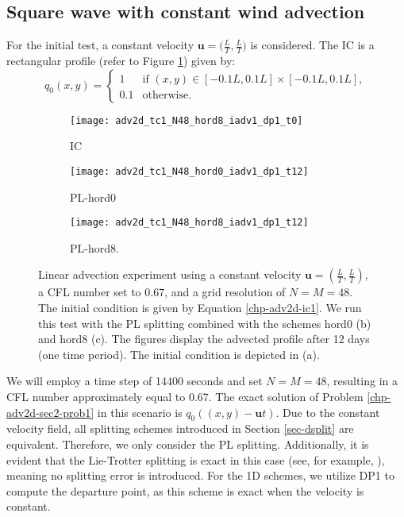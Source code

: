 \subsection{Square wave with constant wind advection}
For the initial test, a constant velocity $\boldsymbol{u}=\big(\frac{L}{T},\frac{L}{T}\big)$ is considered.
The IC is a rectangular profile (refer to Figure \ref{chp-adv2d-sec-exp-adv1-a}) given by:
\begin{equation}
	\label{chp-adv2d-ic1}
	q_0(x,y) =  
	\begin{cases}
		1 & \text{if } (x,y) \in [-0.1L,0.1L]\times [-0.1L,0.1L],\\
		0.1 & \text{otherwise}.
	\end{cases}
\end{equation}
\begin{figure}[!htb]
	\centering
	\begin{subfigure}{0.3\textwidth}
		\centering
		\texttt{[image: adv2d\_tc1\_N48\_hord8\_iadv1\_dp1\_t0]}
		\caption{IC\label{chp-adv2d-sec-exp-adv1-a}}
	\end{subfigure}
	\begin{subfigure}{0.3\textwidth}
		\centering
		\texttt{[image: adv2d\_tc1\_N48\_hord0\_iadv1\_dp1\_t12]}
		\caption{PL-hord0\label{chp-adv2d-sec-exp-adv1-b}}
	\end{subfigure}
	\begin{subfigure}{0.3\textwidth}
		\centering
		\texttt{[image: adv2d\_tc1\_N48\_hord8\_iadv1\_dp1\_t12]}
		\caption{PL-hord8.\label{chp-adv2d-sec-exp-adv1-c}}
	\end{subfigure}	
	\caption{Linear advection experiment using a constant velocity $\boldsymbol{u} = \left(\frac{L}{T},\frac{L}{T}\right)$, 
	a CFL number set to $0.67$, and a grid resolution of $N=M=48$.
	The initial condition is given by Equation \eqref{chp-adv2d-ic1}.
	We run this test with the PL splitting combined with the schemes hord0 (b) and hord8 (c).
        The figures display the advected profile after 12 days (one time period).
        The initial condition is depicted in (a). \label{chp-adv2d-sec-exp-adv1}}
\end{figure}

We will employ a time step of 14400 seconds and set $N=M=48$, resulting in a CFL number approximately equal to 0.67.
The exact solution of Problem \ref{chp-adv2d-sec2-prob1} in this scenario is $q_0((x,y)-\boldsymbol{u}t)$.
Due to the constant velocity field, all splitting schemes introduced in Section \ref{sec-dsplit} are equivalent.
Therefore, we only consider the PL splitting. Additionally, it is evident that the Lie-Trotter splitting is exact in this case 
(see, for example, \cite[p.~202-203]{leveque:1990}), meaning no splitting error is introduced.
For the 1D schemes, we utilize DP1 to compute the departure point, as this scheme is exact when the velocity is constant.

